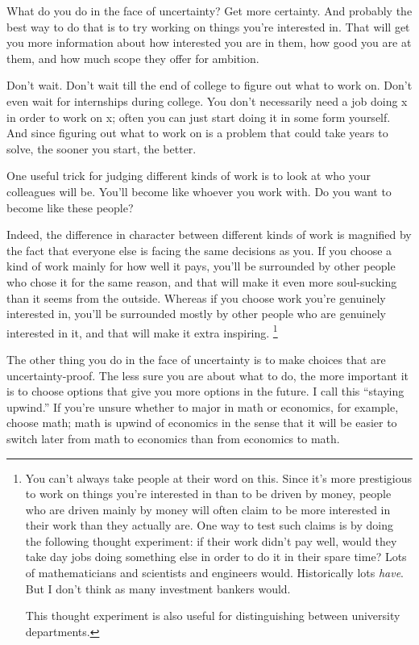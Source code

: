 What do you do in the face of uncertainty? Get more certainty. And
probably the best way to do that is to try working on things you're
interested in. That will get you more information about how interested
you are in them, how good you are at them, and how much scope they offer
for ambition.

Don't wait. Don't wait till the end of college to figure out what to
work on. Don't even wait for internships during college. You don't
necessarily need a job doing x in order to work on x; often you can just
start doing it in some form yourself. And since figuring out what to
work on is a problem that could take years to solve, the sooner you
start, the better.

One useful trick for judging different kinds of work is to look at who
your colleagues will be. You'll become like whoever you work with. Do
you want to become like these people?

Indeed, the difference in character between different kinds of work is
magnified by the fact that everyone else is facing the same decisions as
you. If you choose a kind of work mainly for how well it pays, you'll be
surrounded by other people who chose it for the same reason, and that
will make it even more soul-sucking than it seems from the outside.
Whereas if you choose work you're genuinely interested in, you'll be
surrounded mostly by other people who are genuinely interested in it,
and that will make it extra inspiring. \footnote{You can't always take people at their word on this. Since it's
more prestigious to work on things you're interested in than to be
driven by money, people who are driven mainly by money will often claim
to be more interested in their work than they actually are. One way to
test such claims is by doing the following thought experiment: if their
work didn't pay well, would they take day jobs doing something else in
order to do it in their spare time? Lots of mathematicians and
scientists and engineers would. Historically lots \emph{have}. But I
don't think as many investment bankers would.

This thought experiment is also useful for distinguishing between
university departments.}

The other thing you do in the face of uncertainty is to make choices
that are uncertainty-proof. The less sure you are about what to do, the
more important it is to choose options that give you more options in the
future. I call this ``staying upwind.'' If you're unsure whether to
major in math or economics, for example, choose math; math is upwind of
economics in the sense that it will be easier to switch later from math
to economics than from economics to math.


